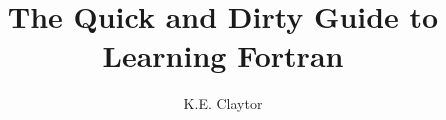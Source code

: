 \documentclass{article}
\title{The Quick and Dirty Guide to Learning Fortran}
\author{K.E. Claytor}
\begin{document}
\maketitle

\pagebreak
\tableofcontents
\pagebreak

\pagebreak

\pagebreak

\pagebreak
%

\appendix

%
\end{document}
